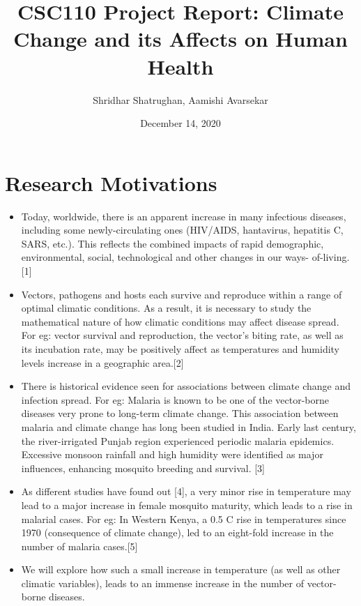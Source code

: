 \documentclass[fontsize=11pt]{article}
\title{CSC110 Project Report: Climate Change and its Affects on Human Health}
\author{Shridhar Shatrughan, Aamishi Avarsekar}
\date{December 14, 2020}
\begin{document}
    \maketitle

    \section*{Research Motivations}

    \begin{itemize}

        \item \large Today, worldwide, there is an apparent increase in many infectious diseases, including some newly-circulating ones (HIV/AIDS, hantavirus, hepatitis C, SARS, etc.). This reflects the combined impacts of rapid demographic, environmental, social, technological and other changes in our ways- of-living.[1]

        \item Vectors, pathogens and hosts each survive and reproduce within a range of optimal climatic conditions. As a result, it is necessary to study the mathematical nature of how climatic conditions may affect disease spread. For eg: vector survival and reproduction, the vector's biting rate, as well as its incubation rate, may be positively affect as temperatures and humidity levels increase in a geographic area.[2]

        \item There is historical evidence seen for associations between climate change and infection spread. For eg: Malaria is known to be one of the vector-borne diseases very prone to long-term climate change. This association between malaria and climate change has long been studied in India. Early last century, the river-irrigated Punjab region
        experienced periodic malaria
        epidemics. Excessive monsoon
        rainfall and high humidity were identified as major influences, enhancing mosquito breeding and survival. [3]

        \item As different studies have found out [4], a very minor rise in temperature may lead to a major increase in female mosquito maturity, which leads to a rise in malarial cases. For eg: In Western Kenya, a 0.5 C rise in temperatures since 1970 (consequence of climate change), led to an eight-fold increase in the number of malaria cases.[5]

        \item We will explore how such a small increase in temperature (as well as other climatic variables), leads to an immense increase in the number of vector-borne diseases.


\end{itemize}
\end{document}
